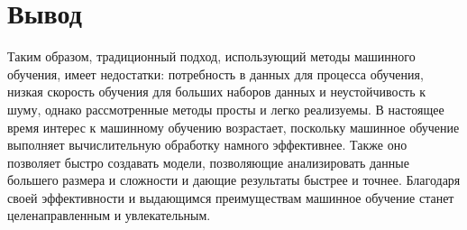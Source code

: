 \section{Вывод}

Таким образом, традиционный подход, использующий методы машинного обучения, имеет недостатки: потребность в данных для процесса обучения, низкая скорость обучения для больших наборов данных и неустойчивость к шуму, однако рассмотренные методы просты и легко реализуемы. В настоящее время интерес к машинному обучению возрастает, поскольку машинное обучение выполняет вычислительную обработку намного эффективнее. Также оно позволяет быстро создавать модели, позволяющие анализировать данные большего размера и сложности и дающие результаты быстрее и точнее. Благодаря своей эффективности и выдающимся преимуществам машинное обучение станет целенаправленным и увлекательным.

